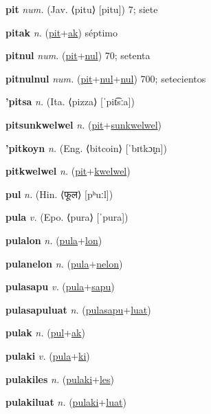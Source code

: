 \textbf{\hypertarget{pit}{pit}} \textit{num.} (Jav. ⟨pitu⟩ [pitu])
7; siete

\textbf{\hypertarget{pitak}{pitak}} \textit{n.} (\hyperlink{pit}{pit}+\allowbreak \hyperlink{ak}{ak})
séptimo

\textbf{\hypertarget{pitnul}{pitnul}} \textit{num.} (\hyperlink{pit}{pit}+\allowbreak \hyperlink{nul}{nul})
70; setenta

\textbf{\hypertarget{pitnulnul}{pitnulnul}} \textit{num.} (\hyperlink{pit}{pit}+\allowbreak \hyperlink{nul}{nul}+\allowbreak \hyperlink{nul}{nul})
700; setecientos

\textbf{\hypertarget{'pitsa}{'pitsa}} \textit{n.} (Ita. ⟨pizza⟩ [ˈpit͡sːa])


\textbf{\hypertarget{pitsunkwelwel}{pitsunkwelwel}} \textit{n.} (\hyperlink{pit}{pit}+\allowbreak \hyperlink{sunkwelwel}{sunkwelwel})


\textbf{\hypertarget{'pitkoyn}{'pitkoyn}} \textit{n.} (Eng. ⟨bitcoin⟩ [ˈbɪtkɔɪ̯n])


\textbf{\hypertarget{pitkwelwel}{pitkwelwel}} \textit{n.} (\hyperlink{pit}{pit}+\allowbreak \hyperlink{kwelwel}{kwelwel})


\textbf{\hypertarget{pul}{pul}} \textit{n.} (Hin. ⟨{\devanagari{}फूल}⟩ [pʰuːl])


\textbf{\hypertarget{pula}{pula}} \textit{v.} (Epo. ⟨pura⟩ [ˈpura])


\textbf{\hypertarget{pulalon}{pulalon}} \textit{n.} (\hyperlink{pula}{pula}+\allowbreak \hyperlink{lon}{lon})


\textbf{\hypertarget{pulanelon}{pulanelon}} \textit{n.} (\hyperlink{pula}{pula}+\allowbreak \hyperlink{nelon}{nelon})


\textbf{\hypertarget{pulasapu}{pulasapu}} \textit{v.} (\hyperlink{pula}{pula}+\allowbreak \hyperlink{sapu}{sapu})


\textbf{\hypertarget{pulasapuluat}{pulasapuluat}} \textit{n.} (\hyperlink{pulasapu}{pulasapu}+\allowbreak \hyperlink{luat}{luat})


\textbf{\hypertarget{pulak}{pulak}} \textit{n.} (\hyperlink{pul}{pul}+\allowbreak \hyperlink{ak}{ak})


\textbf{\hypertarget{pulaki}{pulaki}} \textit{v.} (\hyperlink{pula}{pula}+\allowbreak \hyperlink{ki}{ki})


\textbf{\hypertarget{pulakiles}{pulakiles}} \textit{n.} (\hyperlink{pulaki}{pulaki}+\allowbreak \hyperlink{les}{les})


\textbf{\hypertarget{pulakiluat}{pulakiluat}} \textit{n.} (\hyperlink{pulaki}{pulaki}+\allowbreak \hyperlink{luat}{luat})


